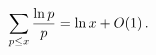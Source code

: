 \[\sum_{p\leq x}\frac{\mathop{\ln\/}\nolimits p}{p}=\mathop{\ln\/}\nolimits x+%
\mathop{O\/}\nolimits\!\left(1\right).\]